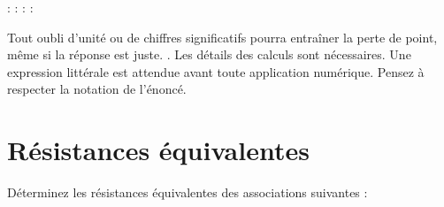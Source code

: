 \documentclass[10pt,a4paper]{article}
\begin{document}
\noindent {} : \hfill {} : \hfill {} : \hfill {} :
\hspace*{3em}\bigbreak

Tout oubli d’unité ou de chiffres significatifs pourra entraîner la perte de
point, même si la réponse est juste. . Les détails des calculs sont nécessaires. Une expression littérale
est attendue avant toute application numérique. Pensez à respecter la notation
de l'énoncé.

\section{Résistances équivalentes}
Déterminez les résistances équivalentes des associations suivantes :

\begin{figure}[htbp!]
    \vspace*{-60pt}
    \centering
    \hfill
    \hfill
        \label{fig:reqs}
\end{figure}

\vfill
\end{document}
